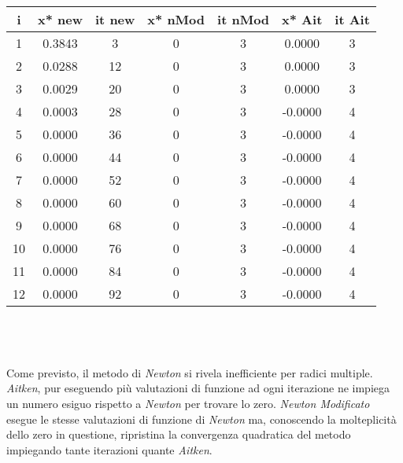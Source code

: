 \documentclass[a4paper]{report}
\begin{document}
\begin{tabular}{|c|c|c|c|c|c|c|}
   	\hline 
	i&x* new&it new&x* nMod&it nMod&x* Ait&it Ait\\ 
	\hline 
	1&0.3843& 3&0&3& 0.0000&3\\
	\hline 
	2&0.0288&12&0&3& 0.0000&3\\
	\hline 
	3&0.0029&20&0&3& 0.0000&3\\
	\hline 
	4&0.0003&28&0&3&-0.0000&4\\
	\hline 
	5&0.0000&36&0&3&-0.0000&4\\
	\hline 
	6&0.0000&44&0&3&-0.0000&4\\
	\hline 
	7&0.0000&52&0&3&-0.0000&4\\
	\hline 
	8&0.0000&60&0&3&-0.0000&4\\
	\hline 
	9&0.0000&68&0&3&-0.0000&4\\
	\hline 
	10&0.0000&76&0&3&-0.0000&4\\
	\hline 
	11&0.0000&84&0&3&-0.0000&4\\
	\hline 
	12&0.0000&92&0&3&-0.0000&4\\
	\hline
\end{tabular} 
\\ \\ \\Come previsto, il metodo di \emph{Newton} si rivela inefficiente per radici multiple. \emph{Aitken}, pur eseguendo più valutazioni di funzione ad ogni iterazione ne impiega un numero esiguo rispetto a \emph{Newton} per trovare lo zero. \emph{Newton Modificato} esegue le stesse valutazioni di funzione di \emph{Newton} ma, conoscendo la molteplicità dello zero in questione, ripristina la convergenza quadratica del metodo impiegando tante iterazioni quante \emph{Aitken}.
\newpage
\end{document}

